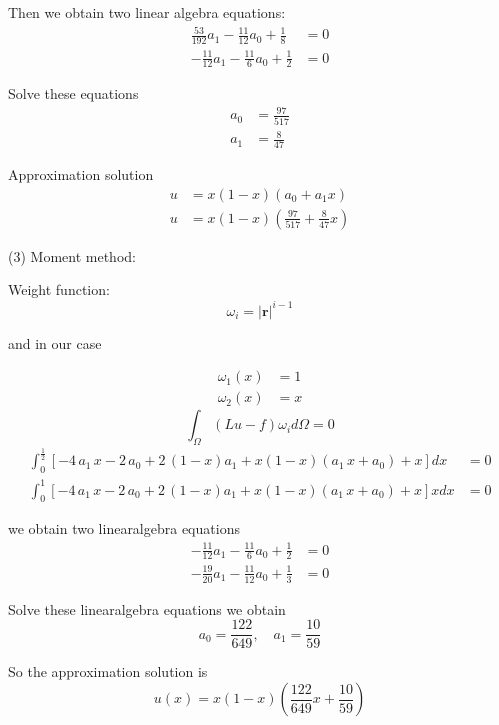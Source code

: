 \documentclass{article}%
\begin{document}
Then we obtain two linear algebra equations:%
\begin{align*}
\frac{53}{192}a_{1}-\frac{11}{12}a_{0}+\frac{1}{8}  &  =0\\
-\frac{11}{12}a_{1}-\frac{11}{6}a_{0}+\frac{1}{2}  &  =0
\end{align*}


Solve these equations%
\begin{align*}
a_{0}  &  =\frac{97}{517}\\
a_{1}  &  =\frac{8}{47}%
\end{align*}


Approximation solution%
\begin{align*}
u  &  =x\left(  1-x\right)  \left(  a_{0}+a_{1}x\right) \\
u  &  =x\left(  1-x\right)  \left(  \frac{97}{517}+\frac{8}{47}x\right)
\end{align*}


(3) Moment method:

Weight function:%
\[
\omega_{i}=\left\vert \mathbf{r}\right\vert ^{i-1}%
\]


and in our case%

\begin{align*}
\omega_{1}\left(  x\right)   &  =1\\
\omega_{2}\left(  x\right)   &  =x
\end{align*}%
\[
\int_{\Omega}\left(  Lu-f\right)  \omega_{i}d\Omega=0
\]%
\begin{align*}
\int_{0}^{\frac{1}{2}}\left[  -4\,a_{1}\,x-2\,a_{0}+2\,\left(  1-x\right)
a_{1}+x\left(  1-x\right)  \left(  a_{1}\,x+a_{0}\right)  +x\right]  dx  &
=0\\
\int_{0}^{1}\left[  -4\,a_{1}\,x-2\,a_{0}+2\,\left(  1-x\right)
a_{1}+x\left(  1-x\right)  \left(  a_{1}\,x+a_{0}\right)  +x\right]  xdx  &
=0
\end{align*}


we obtain two linearalgebra equations%
\begin{align*}
-\frac{11}{12}a_{1}-\frac{11}{6}a_{0}+\frac{1}{2}  &  =0\\
-\frac{19}{20}a_{1}-\frac{11}{12}a_{0}+\frac{1}{3}  &  =0
\end{align*}


Solve these linearalgebra equations we obtain%
\[
a_{0}=\frac{122}{649},\quad a_{1}=\frac{10}{59}%
\]


So the approximation solution is%
\[
u\left(  x\right)  =x\left(  1-x\right)  \left(  \frac{122}{649}x+\frac
{10}{59}\right)
\]
\end{document}
